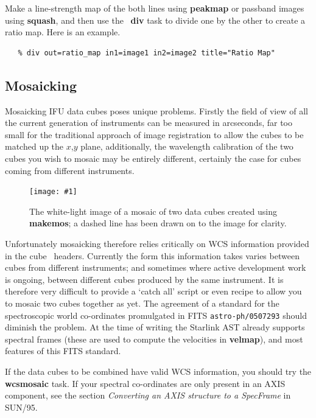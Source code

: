 \documentclass[twoside,11pt]{article}
\newcommand{\htmladdimg}[1]{}
\newcommand{\xref}[3]{#1}
\newcommand{\xlabel}[1]{}
\newcommand{\latex}[1]{#1}
\newcommand{\myfig} [5] {
  \begin{figure}[thb]
    \centering\texttt{[image: \#1]}
    \typeout{#1 inserted on page \arabic{page}}
    \caption{\label{#4}#5}
  \end{figure}
  }
\newcommand{\myfig}[5]{
    \label{#4} \htmladdimg{#3}\\
    Figure: #5\\
    }
\begin{document}
{Make a line-strength map of the both lines using \xref{{\bf
peakmap}}{sun237}{peakmap} or passband images using \xref{{\bf
squash}}{sun237}{squash}, and then use the \KAPPA\ 
\xref{{\bf div}}{sun95}{DIV} task to divide one by the other to create a
ratio map.  Here is an example.

\small\begin{verbatim}
   % div out=ratio_map in1=image1 in2=image2 title="Ratio Map"
\end{verbatim}\normalsize

\subsection{\xlabel{sc16_mos}Mosaicking\label{sc16_mos}}

Mosaicking IFU data cubes poses unique problems.  Firstly the
field of view of all the current generation of instruments can be
measured in arcseconds, far too small for the traditional approach of
image registration to allow the cubes to be matched up the $x$,$y$
plane, additionally, the wavelength calibration of the two cubes you
wish to mosaic may be entirely different, certainly the case for cubes
coming from different instruments.

\myfig{sc16_mosaic.eps}{height=0.5\textheight}{sc16_mosaic.gif}{sc16_mosaic_fig}{The
white-light image of a mosaic of two data cubes created using {\bf makemos};
a dashed line has been drawn on to the image for clarity.}

Unfortunately mosaicking therefore relies critically on WCS
information provided in the cube \FITSref\ headers.  Currently the form
this information takes varies between cubes from different
instruments; and sometimes where active development work is ongoing,
between different cubes produced by the same instrument.  It is
therefore very difficult to provide a `catch all' script or even
recipe to allow you to mosaic two cubes together as yet.  The
agreement of a standard for the spectroscopic world co-ordinates
promulgated in FITS {\tt astro-ph/0507293} should diminish the problem.
At the time of writing the Starlink \xref{AST}{sun210}{} already
supports spectral frames (these are used to compute the velocities in
{\bf velmap}), and most features of this FITS standard.

If the data cubes to be combined have valid WCS information,
you should try the \xref{{\bf wcsmosaic}}{sun95}{WCSMOSAIC} task.
If your spectral co-ordinates are only present in an AXIS component,
see the section \xref{{\em Converting an AXIS structure to a
SpecFrame}}{sun95}{se_wcsuse}{\latex{ in SUN/95}}.

}
\end{document}

